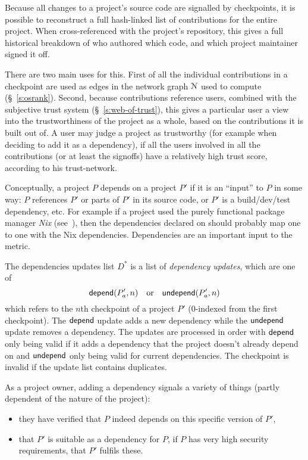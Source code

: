 Because all changes to a project's source code are signalled by
checkpoints, it is possible to reconstruct a full hash-linked list of
contributions for the entire project. When cross-referenced with the
project's repository, this gives a full historical breakdown of who
authored which code, and which project maintainer signed it off.

There are two main uses for this. First of all the individual
contributions in a checkpoint are used as edges in the network graph
$\mathcal{N}$ used to compute \osrank{} (\S~\ref{s:osrank}).
Second, because contributions reference users, combined with the
subjective trust system (\S~\ref{s:web-of-trust}), this gives a
particular user a view into the trustworthiness of the project as a
whole, based on the contributions it is built out of. A user may judge
a project as trustworthy (for example when deciding to add it as a
dependency), if all the users involved in all the contributions (or at
least the signoffs) have a relatively high trust score, according to
his trust-network.

\label{s:dependencies}
Conceptually, a project $P$ depends on a project $P'$ if it is an
``input'' to $P$ in some way: $P$ references $P'$ or parts of
$P'$ in its source code, or $P'$ is a build/dev/test dependency,
etc. For example if a project used the purely functional package
manager \emph{Nix} (see~\cite{nix}), then the dependencies declared on
\oscoin{} should probably map one to one with the Nix
dependencies. Dependencies are an important input to the \osrank{}
metric.

The dependencies updates list $D^*$ is a list of \emph{dependency
  updates}, which are one of
\[
    \mathsf{depend}(P'_a, n) \quad \text{or} \quad \mathsf{undepend}(P'_a, n)
\]
which refers to the $n$th checkpoint of a project $P'$ ($0$-indexed
from the first checkpoint). The $\mathsf{depend}$ update adds a new dependency
while the $\mathsf{undepend}$ update removes a dependency. The updates are
processed in order with $\mathsf{depend}$ only being valid if it adds a
dependency that the project doesn't already depend on and $\mathsf{undepend}$
only being valid for current dependencies. The checkpoint is invalid
if the update list contains duplicates.

As a project owner, adding a dependency signals a variety of things
(partly dependent of the nature of the project):
\begin{itemize}
\item they have verified that $P$ indeed depends on this specific
  version of $P'$,
\item that $P'$ is suitable as a dependency for $P$, \eg{} if $P$ has
  very high security requirements, that $P'$ fulfils these.
\end{itemize}

